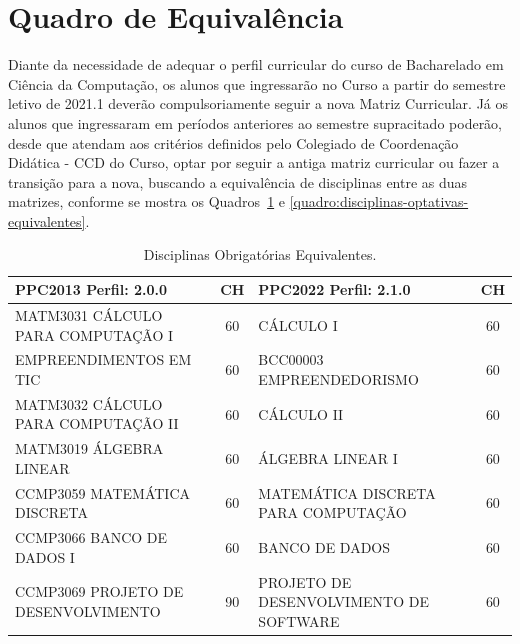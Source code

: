 \documentclass[
	12pt,				%
	openright,			%
  oneside,     %
	a4paper,			%
	chapter=TITLE,		%
	english,			%
	french,				%
	spanish,			%
	brazil				%
	]{abntex2}
\begin{document}
  \section{Quadro de Equivalência}
  
  Diante da necessidade de adequar o perfil curricular do curso de Bacharelado em Ciência da Computação, os alunos que ingressarão no Curso a partir do semestre letivo de 2021.1 deverão compulsoriamente seguir a nova Matriz Curricular. Já os alunos que ingressaram em períodos anteriores ao semestre supracitado poderão, desde que atendam aos critérios definidos pelo Colegiado de Coordenação Didática - CCD do Curso, optar por seguir a antiga matriz curricular ou fazer a transição para a nova, buscando a equivalência de disciplinas entre as duas matrizes, conforme se mostra os Quadros~\ref{quadro:disciplinas-obrigatorias-equivalentes} e \ref{quadro:disciplinas-optativas-equivalentes}. 
  
  \begin{center}
    
    \begin{tiny}
      \begin{longtable}{p{6.5cm}cp{6.5cm}c}
        \caption{\label{quadro:disciplinas-obrigatorias-equivalentes}Disciplinas Obrigatórias Equivalentes.}\\
      \toprule
      \textbf{PPC2013 Perfil: 2.0.0} & \textbf{CH} & \textbf{PPC2022 Perfil: 2.1.0} & \textbf{CH}\\
      \midrule
      MATM3031 CÁLCULO PARA COMPUTAÇÃO I  & 60 & CÁLCULO I & 60 \\ \midrule
      EMPREENDIMENTOS EM TIC & 60 & BCC00003 EMPREENDEDORISMO & 60 \\ \midrule
      MATM3032 CÁLCULO PARA COMPUTAÇÃO II  & 60 & CÁLCULO II & 60 \\ \midrule
      MATM3019 ÁLGEBRA LINEAR  & 60 & ÁLGEBRA LINEAR I & 60 \\ \midrule
      CCMP3059 MATEMÁTICA DISCRETA  & 60 & MATEMÁTICA DISCRETA PARA COMPUTAÇÃO & 60 \\ \midrule
      CCMP3066 BANCO DE DADOS I & 60 & BANCO DE DADOS & 60 \\ \midrule
      CCMP3069 PROJETO DE DESENVOLVIMENTO & 90 & PROJETO DE DESENVOLVIMENTO DE SOFTWARE & 60 \\
  \bottomrule
  \end{longtable}
  \end{tiny}
  \end{center}
  
\end{document}
